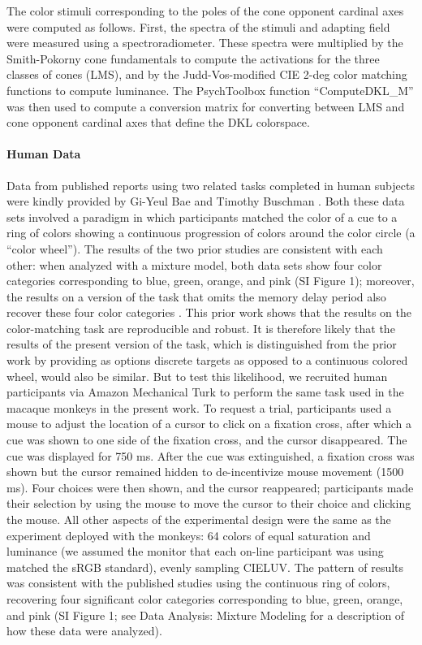 The color stimuli corresponding to the poles of the cone opponent cardinal axes were computed as follows. 
First, the spectra of the stimuli and adapting field were measured using a spectroradiometer. 
These spectra were multiplied by the Smith-Pokorny cone fundamentals to compute the activations for the three classes of cones (LMS), and by the Judd-Vos-modified CIE 2-deg color matching functions to compute luminance. 
The PsychToolbox function “ComputeDKL\_M” was then used to compute a conversion matrix for converting between LMS and cone opponent cardinal axes that define the DKL colorspace. 

\paragraph{Human Data}

Data from published reports using two related tasks completed in human subjects were kindly provided by Gi-Yeul Bae \citep{bae_why_2015} and Timothy Buschman \citep{panichello_error-correcting_2019}.
Both these data sets involved a paradigm in which participants matched the color of a cue to a ring of colors showing a continuous progression of colors around the color circle (a ``color wheel''). 
The results of the two prior studies are consistent with each other: when analyzed with a mixture model, both data sets show four color categories corresponding to blue, green, orange, and pink (SI Figure 1); moreover, the results on a version of the task that omits the memory delay period also recover these four color categories \citep{bae_why_2015}.
This prior work shows that the results on the color-matching task are reproducible and robust. 
It is therefore likely that the results of the present version of the task, which is distinguished from the prior work by providing as options discrete targets as opposed to a continuous colored wheel, would also be similar. 
But to test this likelihood, we recruited human participants via Amazon Mechanical Turk to perform the same task used in the macaque monkeys in the present work. 
To request a trial, participants used a mouse to adjust the location of a cursor to click on a fixation cross, after which a cue was shown to one side of the fixation cross, and the cursor disappeared. The cue was displayed for 750 ms. 
After the cue was extinguished, a fixation cross was shown but the cursor remained hidden to de-incentivize mouse movement (1500 ms). Four choices were then shown, and the cursor reappeared; participants made their selection by using the mouse to move the cursor to their choice and clicking the mouse. 
All other aspects of the experimental design were the same as the experiment deployed with the monkeys: 64 colors of equal saturation and luminance (we assumed the monitor that each on-line participant was using matched the sRGB standard), evenly sampling CIELUV. 
The pattern of results was consistent with the published studies using the continuous ring of colors, recovering four significant color categories corresponding to blue, green, orange, and pink (SI Figure 1; see Data Analysis: Mixture Modeling for a description of how these data were analyzed). %

